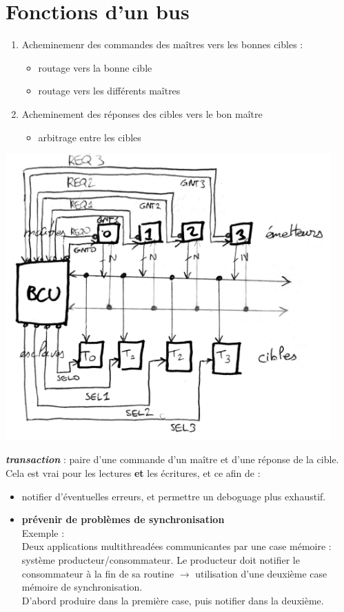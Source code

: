 \section{Fonctions d'un bus}
\begin{enumerate}
  \item Acheminemenr des commandes des maîtres vers les bonnes cibles :
  \begin{itemize}
    \item routage vers la bonne cible
    \item routage vers les différents maîtres
  \end{itemize}
  \item Acheminement des réponses des cibles vers le bon maître
  \begin{itemize}
    \item arbitrage entre les cibles
  \end{itemize}
\end{enumerate}\begin{center}
  \includegraphics[height=11cm]{cours2/pics/bcu.jpg}
\end{center}
{\it\bf transaction} : paire d'une commande d'un maître et d'une réponse de la cible.\\
Cela est vrai pour les lectures {\bf et} les écritures, et ce afin de :
\begin{itemize}
  \item notifier d'éventuelles erreurs, et permettre un deboguage plus exhaustif.
  \item {\bf prévenir de problèmes de synchronisation}\\
  Exemple : \\
  Deux applications multithreadées communicantes par une case mémoire : système
  producteur/consommateur. Le producteur doit notifier le consommateur à la fin
  de sa routine $\rightarrow$ utilisation d'une deuxième case mémoire de synchronisation.\\
  D'abord produire dans la première case, puis notifier dans la deuxième.
\end{itemize}

